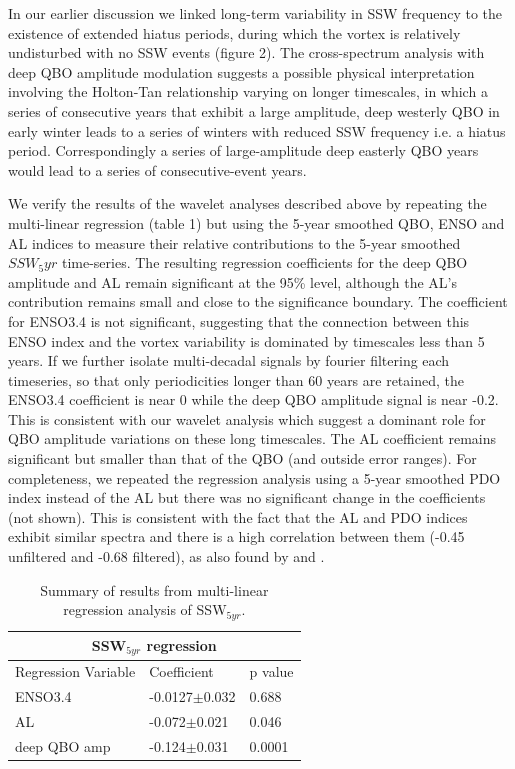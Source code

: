 In our earlier discussion we linked long-term variability in SSW frequency to the existence of extended hiatus periods, during which the vortex is relatively undisturbed with no SSW events (figure 2). The cross-spectrum analysis with deep QBO amplitude modulation suggests a possible physical interpretation involving the Holton-Tan relationship varying on longer timescales, in which a series of consecutive years that exhibit a large amplitude, deep westerly QBO in early winter leads to a series of winters with reduced SSW frequency i.e. a hiatus period. Correspondingly a series of large-amplitude deep easterly QBO years would lead to a series of consecutive-event years.

We verify the results of the wavelet analyses described above by repeating the multi-linear regression (table 1) but using the 5-year smoothed QBO, ENSO and AL indices to measure their  relative contributions to the 5-year smoothed  $SSW_5yr$ time-series. The resulting regression coefficients for the deep QBO amplitude and AL remain significant at the 95\% level, although the AL's contribution remains small and close to the significance boundary. The coefficient for ENSO3.4 is not significant, suggesting that the connection between this ENSO index and the vortex variability is dominated by timescales less than 5 years. If we further isolate multi-decadal signals by fourier filtering each timeseries, so that only periodicities longer than 60 years are retained, the ENSO3.4 coefficient is near 0 while the deep QBO amplitude signal is near -0.2. This is consistent with our wavelet analysis which suggest a dominant role for QBO amplitude variations on these long timescales. The AL coefficient remains significant but smaller than that of the QBO (and outside error ranges). For completeness, we repeated the regression analysis using a 5-year smoothed PDO index instead of the AL but there was no significant change in the coefficients (not shown). This is consistent with the fact that the AL and PDO indices exhibit similar spectra and there is a high correlation between them (-0.45 unfiltered and -0.68 filtered), as also found by \cite{mantuaPacific1997} and \cite{rodionovSpatial2005}. 

\begin{table}
\centering
\begin{tabular}{|p{3cm}||p{3cm}|p{3cm}|}
 \hline
 \multicolumn{3}{|c|}{SSW$_{5yr}$ regression}\\
 \hline
 Regression Variable& Coefficient& p value\\
 \hline
 ENSO3.4  & -0.0127$\pm$0.032& 0.688\\
 AL  &   -0.072$\pm$0.021  & 0.046\\
 deep QBO amp &-0.124$\pm$0.031&0.0001\\
 \hline
\end{tabular}
\begin{center}
\caption{Summary of results from multi-linear regression analysis of SSW$_{5yr}$.} 
\end{center}
\end{table}

